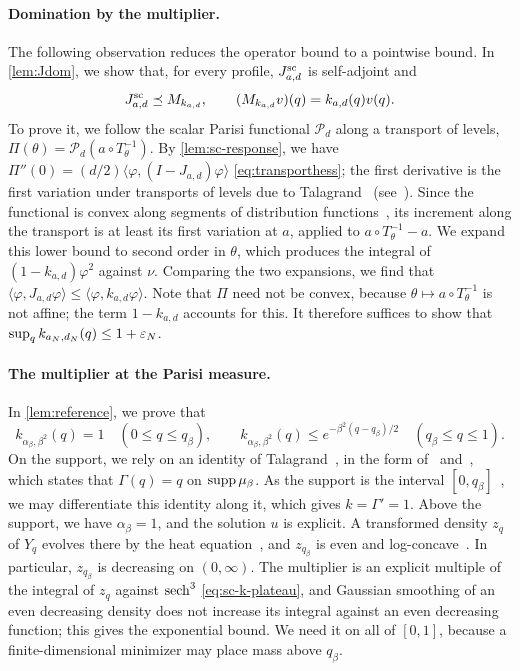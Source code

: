 \paragraph{Domination by the multiplier.}
The following observation reduces the operator bound to a pointwise
bound. In \cref{lem:Jdom}, we show that, for every profile,
$J^{\mathrm{sc}}_{a,d}$ is self-adjoint and
\[
 J^{\mathrm{sc}}_{a,d}\preceq M_{k_{a,d}},\qquad
 (M_{k_{a,d}}v)(q)=k_{a,d}(q)v(q).
\]
To prove it, we follow the scalar Parisi functional $\mathcal P_d$ along
a transport of levels, $\Pi(\theta)=\mathcal P_d(a\circ T_\theta^{-1})$.
By \cref{lem:sc-response}, we have
$\Pi''(0)=(d/2)\langle\varphi,(I-J_{a,d})\varphi\rangle$
\eqref{eq:transporthess}; the first derivative is the first variation
under transports of levels due to
Talagrand~\cite{Talagrand2006ParisiMeasures}
(see~\cite[Section~3, (19)]{AuffingerChen2015Properties}). Since the functional is convex along segments of distribution
functions~\cite{AuffingerChen2015Uniqueness}, its increment along the
transport is at least its first variation at $a$, applied to
$a\circ T_\theta^{-1}-a$. We expand this lower bound to second order in
$\theta$, which produces the integral of $(1-k_{a,d})\varphi^2$ against
$\nu$. Comparing the two expansions, we find that
$\langle\varphi,J_{a,d}\varphi\rangle\le\langle\varphi,k_{a,d}\varphi\rangle$.
Note that $\Pi$ need not be convex, because
$\theta\mapsto a\circ T_\theta^{-1}$ is not affine; the term
$1-k_{a,d}$ accounts for this. It therefore suffices to show that
$\sup_qk_{a_N,d_N}(q)\le1+\varepsilon_N$.

\paragraph{The multiplier at the Parisi measure.}
In \cref{lem:reference}, we prove that
\[
 k_{\alpha_\beta,\beta^2}(q)=1\quad(0\le q\le q_\beta),\qquad
 k_{\alpha_\beta,\beta^2}(q)\le e^{-\beta^2(q-q_\beta)/2}
 \quad(q_\beta\le q\le1).
\]
On the support, we rely on an identity of
Talagrand~\cite{Talagrand2006ParisiMeasures}, in the form
of~\cite[Theorem~5]{AuffingerChen2015Properties}
and~\cite[Lemma~2.6]{Lopatto}, which states that $\Gamma(q)=q$ on
$\operatorname{supp}\mu_\beta$. As the support is the interval
$[0,q_\beta]$~\cite[Theorem~1.1]{Lopatto}, we may differentiate this
identity along it, which gives $k=\Gamma'=1$. Above the support,
we have $\alpha_\beta=1$, and the solution $u$ is explicit. A
transformed density $z_q$ of $Y_q$ evolves there by the heat
equation~\cite[Lemma~2.4(ii)]{Lopatto}, and $z_{q_\beta}$ is even and
log-concave~\cite[Proposition~4.1]{Lopatto}. In particular,
$z_{q_\beta}$ is decreasing on $(0,\infty)$. The multiplier is an
explicit multiple of the integral of $z_q$ against $\operatorname{sech}^3$
\eqref{eq:sc-k-plateau}, and Gaussian smoothing of an even decreasing
density does not increase its integral against an even decreasing
function; this gives the exponential bound. We need it on all of
$[0,1]$, because a finite-dimensional minimizer may place mass above
$q_\beta$.


